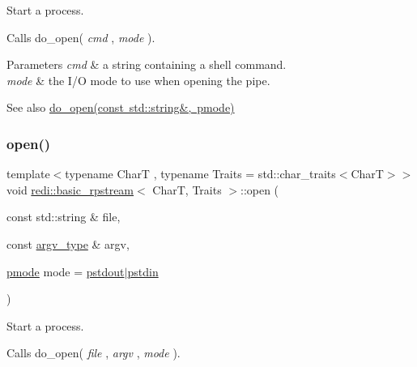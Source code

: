 Start a process. 

Calls do\+\_\+open( {\itshape cmd} , {\itshape mode} ).


\begin{DoxyParams}{Parameters}
{\em cmd} & a string containing a shell command. \\
\hline
{\em mode} & the I/O mode to use when opening the pipe. \\
\hline
\end{DoxyParams}
\begin{DoxySeeAlso}{See also}
\mbox{\hyperlink{classredi_1_1pstream__common_a2505ab3e3a834b92d98b5bcb97734dfe}{do\+\_\+open(const std\+::string\&, pmode)}} 
\end{DoxySeeAlso}
\mbox{\label{classredi_1_1basic__rpstream_a4423510e97fc8216f80f020c5411c09d}} 
\subsubsection{\texorpdfstring{open()}{open()}\hspace{0.1cm}{\footnotesize\ttfamily [2/2]}}
{\footnotesize\ttfamily template$<$typename CharT , typename Traits  = std\+::char\+\_\+traits$<$\+Char\+T$>$$>$ \\
void \mbox{\hyperlink{classredi_1_1basic__rpstream}{redi\+::basic\+\_\+rpstream}}$<$ CharT, Traits $>$\+::open (\begin{DoxyParamCaption}\item[{const std\+::string \&}]{file,  }\item[{const \mbox{\hyperlink{structredi_1_1pstreams_af902b894b095c1875e96c10129489467}{argv\+\_\+type}} \&}]{argv,  }\item[{\mbox{\hyperlink{structredi_1_1pstreams_a1eae4aad88812af03a0fbb3ec13c50b7}{pmode}}}]{mode = {\ttfamily \mbox{\hyperlink{structredi_1_1pstreams_ad3c6d53a98de4566478b1c40c101a42b}{pstdout}}$\vert$\mbox{\hyperlink{structredi_1_1pstreams_a7a976ce992db857f86a0cc3352e42d3a}{pstdin}}} }\end{DoxyParamCaption})\hspace{0.3cm}{\ttfamily [inline]}}



Start a process. 

Calls do\+\_\+open( {\itshape file} , {\itshape argv} , {\itshape mode} ).


